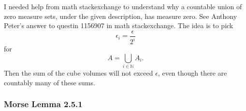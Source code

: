 \documentclass[12pt]{article}
\begin{document}
I needed help from math stackexchange to understand why a countable union of
zero measure sets, under the given description, has measure zero. See
Anthony Peter's answer to questin 1156907 in math stackexchange. The
idea is to pick
\begin{equation}
  \label{eq:ooghoiph}
\epsilon_{i}=\frac{\epsilon}{2^{i}}
\end{equation}
for
\begin{equation}
  \label{eq:fiaweeba}
  A=\bigcup_{i\in\mathbb{N}}A_{i}.
\end{equation}
Then the sum of the cube volumes will not exceed $\epsilon$, even
though there are countably many of these sums.

\subsubsection{Morse Lemma 2.5.1}
\label{subsubsection:haixifie}
\end{document}
